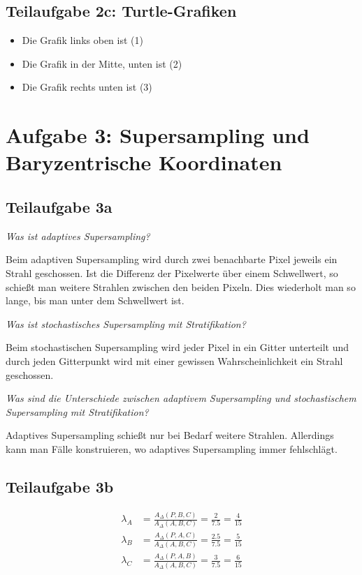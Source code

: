 \documentclass[a4paper]{scrartcl}
\begin{document}
\subsection*{Teilaufgabe 2c: Turtle-Grafiken}

\begin{itemize}
    \item Die Grafik links oben ist (1)
    \item Die Grafik in der Mitte, unten ist (2)
    \item Die Grafik rechts unten ist (3)
\end{itemize}

\section*{Aufgabe 3: Supersampling und Baryzentrische Koordinaten}
\subsection*{Teilaufgabe 3a}
\textit{Was ist adaptives Supersampling?}

Beim adaptiven Supersampling wird durch zwei benachbarte Pixel jeweils ein
Strahl geschossen. Ist die Differenz der Pixelwerte über einem Schwellwert, so
schießt man weitere Strahlen zwischen den beiden Pixeln. Dies wiederholt man
so lange, bis man unter dem Schwellwert ist.

\textit{Was ist stochastisches Supersampling mit Stratifikation?}

Beim stochastischen Supersampling wird jeder Pixel in ein Gitter unterteilt
und durch jeden Gitterpunkt wird mit einer gewissen Wahrscheinlichkeit ein
Strahl geschossen.

\textit{Was sind die Unterschiede zwischen adaptivem Supersampling und stochastischem
Supersampling mit Stratifikation?}

Adaptives Supersampling schießt nur bei Bedarf weitere Strahlen. Allerdings
kann man Fälle konstruieren, wo adaptives Supersampling immer fehlschlägt.

\subsection*{Teilaufgabe 3b}

\begin{align}
    \lambda_A &= \frac{A_\Delta(P,B,C)}{A_\Delta(A,B,C)} = \frac{2}{7.5} = \frac{4}{15}\\
    \lambda_B &= \frac{A_\Delta(P,A,C)}{A_\Delta(A,B,C)} = \frac{2.5}{7.5} = \frac{5}{15}\\
    \lambda_C &= \frac{A_\Delta(P,A,B)}{A_\Delta(A,B,C)} = \frac{3}{7.5} = \frac{6}{15}
\end{align}
\end{document}
